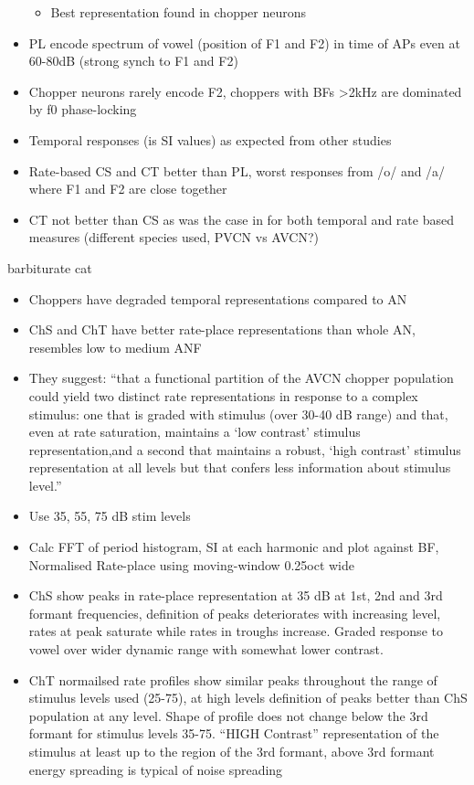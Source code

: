 \documentclass[10pt,a4paper]{article}
\begin{document}
\begin{itemize}
  \begin{itemize}
  \item Best representation found in chopper neurons
  \end{itemize}
\item PL encode spectrum of vowel (position of F1 and F2) in time of APs even at
  60-80dB (strong synch to F1 and F2)
\item Chopper neurons rarely encode F2, choppers with BFs {\textgreater}2kHz are
  dominated by f0 phase-locking
\item Temporal responses (is SI values) as expected from other studies
\item Rate-based CS and CT better than PL, worst responses from /o/ and /a/
  where F1 and F2 are close together
\item CT not better than CS as was the case in \citep{BlackburnSachs:1990} for
  both temporal and rate based measures (different species used, PVCN vs AVCN?)
\end{itemize}
\citep{BlackburnSachs:1990} barbiturate cat


\begin{itemize}
\item Choppers have degraded temporal representations compared to AN
\item ChS and ChT have better rate-place representations than whole AN,
  resembles low to medium ANF
\item They suggest: {\textquotedblleft}that a functional partition of the AVCN
  chopper population could yield two distinct rate representations in response
  to a complex stimulus: one that is graded with stimulus (over 30-40 dB range)
  and that, even at rate saturation, maintains a {\textquoteleft}low
  contrast{\textquoteright} stimulus representation,and a second that maintains
  a robust, {\textquoteleft}high contrast{\textquoteright} stimulus
  representation at all levels but that confers less information about stimulus
  level.{\textquotedblright}
\item Use 35, 55, 75 dB stim levels
\item Calc FFT of period histogram, SI at each harmonic and plot against BF,
  Normalised Rate-place using moving-window 0.25oct wide \citep{YoundSachs:1981}
\item ChS show peaks in rate-place representation at 35 dB at 1st, 2nd and 3rd
  formant frequencies, definition of peaks deteriorates with increasing level,
  rates at peak saturate while rates in troughs increase.  Graded response to
  vowel over wider dynamic range with somewhat lower contrast.
\item ChT normailsed rate profiles show similar peaks throughout the range of
  stimulus levels used (25-75), at high levels definition of peaks better than
  ChS population at any level.  Shape of profile does not change below the 3rd
  formant for stimulus levels 35-75.  {\textquotedblleft}HIGH
  Contrast{\textquotedblright} representation of the stimulus at least up to the
  region of the 3rd formant, above 3rd formant energy spreading is typical of
  noise spreading
\end{itemize}
\citep{MayPrellEtAl:1998}
\end{document}
